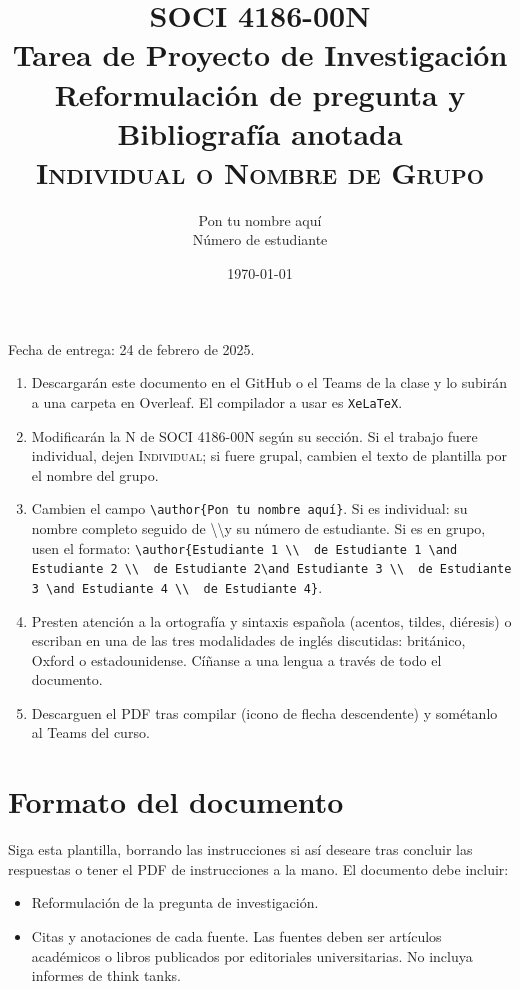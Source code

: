 \documentclass[11pt]{article}
\title{SOCI 4186-00N\\ Tarea de Proyecto de Investigación \textnumero 2 \\ Reformulación de pregunta y Bibliografía anotada \\ \textsc{Individual o Nombre de Grupo}}
\author{Pon tu nombre aquí \\ Número de estudiante}
\date{\today} %
\begin{document}
\singlespacing
\maketitle
Fecha de entrega: 24 de febrero de 2025.

\begin{enumerate}
    \item Descargarán este documento en el GitHub o el Teams de la clase y lo subirán a una carpeta en Overleaf. El compilador a usar es \texttt{XeLaTeX}.
    \item Modificarán la N de SOCI 4186-00N según su sección. Si el trabajo fuere individual, dejen \textsc{Individual}; si fuere grupal, cambien el texto de plantilla por el nombre del grupo.
    \item Cambien el campo \texttt{\textbackslash author\{Pon tu nombre aquí\}}. Si es individual: su nombre completo seguido de \textbackslash\textbackslash y su número de estudiante. Si es en grupo, usen el formato: \texttt{\textbackslash author\{Estudiante 1 \textbackslash\textbackslash \ \textnumero\ de Estudiante 1 \textbackslash and Estudiante 2 \textbackslash\textbackslash \ \textnumero\ de Estudiante 2\textbackslash and Estudiante 3 \textbackslash\textbackslash \ \textnumero\ de Estudiante 3 \textbackslash and Estudiante 4 \textbackslash\textbackslash\ \textnumero\ de Estudiante 4\}}.
    \item Presten atención a la ortografía y sintaxis española (acentos, tildes, diéresis) o escriban en una de las tres modalidades de inglés discutidas: británico, Oxford o estadounidense. Cíñanse a una lengua a través de todo el documento.
    \item Descarguen el PDF tras compilar (icono de flecha descendente) y sométanlo al Teams del curso.
\end{enumerate}

\section*{Formato del documento}
Siga esta plantilla, borrando las instrucciones si así deseare tras concluir las respuestas o tener el PDF de instrucciones a la mano. El documento debe incluir:
\begin{itemize}
    \item Reformulación de la pregunta de investigación.
    \item Citas y anotaciones de cada fuente. Las fuentes deben ser artículos académicos o libros publicados por editoriales universitarias. No incluya informes de think tanks.
\end{itemize}
\onehalfspacing
\end{document}
